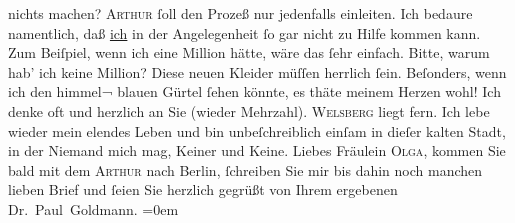 \begin{ledgroupsized}[t]{13cm}
               nichts machen? \textsc{Arthur} ſoll den Prozeß nur jedenfalls
               einleiten. Ich bedaure namentlich, daß \uline{ich} in der
               Angelegenheit ſo gar nicht zu Hilfe kommen kann. Zum Beiſpiel, wenn ich eine Million
               hätte, wäre das ſehr einfach. Bitte, warum hab’ ich keine Million?\pend
           \pstart
           Diese neuen Kleider müſſen herrlich ſein. Beſonders, wenn ich den himmel¬ blauen
               Gürtel ſehen könnte, es thäte meinem Herzen wohl!\pend
           \pstart
           Ich denke oft und herzlich an Sie (wieder Mehrzahl). \textsc{Welsberg} liegt fern. Ich lebe wieder mein elendes Leben und bin unbeſchreiblich einſam
               in dieſer kalten Stadt, in der
               Niemand mich mag, Keiner und Keine.\pend
           \pstart
           {\pb}Liebes Fräulein \textsc{Olga},
               kommen Sie bald mit dem \textsc{Arthur} nach Berlin, ſchreiben Sie mir bis dahin noch manchen lieben Brief
               und ſeien Sie herzlich gegrüßt von\pend
           \pstart
            Ihrem ergebenen{\\[\baselineskip]}\spacefill\mbox{Dr. Paul Goldmann.}\pend
           \leftskip=0em{}
         
         \endnumbering{}\end{ledgroupsized}  \newcommand{\dateiname}{L03086}\newcommand{\titel}{Paul Goldmann an Arthur Schnitzler, Olga und Elisabeth Gussmann, 27. 9. [1901]}\newcommand{\editorInnen}{Martin Anton Müller und Laura Untner}
      